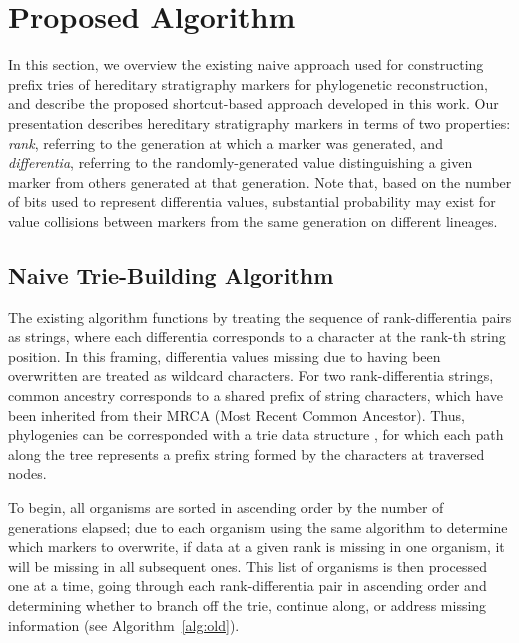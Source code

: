 \section{Proposed Algorithm} \label{sec:algorithm}

In this section, we overview the existing naive approach used for constructing prefix tries of hereditary stratigraphy markers for phylogenetic reconstruction, and describe the proposed shortcut-based approach developed in this work.
Our presentation describes hereditary stratigraphy markers in terms of two properties: \textit{rank}, referring to the generation at which a marker was generated, and \textit{differentia}, referring to the randomly-generated value distinguishing a given marker from others generated at that generation.
Note that, based on the number of bits used to represent differentia values, substantial probability may exist for value collisions between markers from the same generation on different lineages.

\subsection{Naive Trie-Building Algorithm} \label{sec:algorithm:naive}

The existing algorithm functions by treating the sequence of rank-differentia pairs as strings, where each differentia corresponds to a character at the rank-th string position.
In this framing, differentia values missing due to having been overwritten are treated as wildcard characters.
For two rank-differentia strings, common ancestry corresponds to a shared prefix of string characters, which have been inherited from their MRCA (Most Recent Common Ancestor).
Thus, phylogenies can be corresponded with a trie data structure \citep{fredkin1960trie}, for which each path along the tree represents a prefix string formed by the characters at traversed nodes.

To begin, all organisms are sorted in ascending order by the number of generations elapsed; due to each organism using the same algorithm to determine which markers to overwrite, if data at a given rank is missing in one organism, it will be missing in all subsequent ones.
This list of organisms is then processed one at a time, going through each rank-differentia pair in ascending order and determining whether to branch off the trie, continue along, or address missing information (see Algorithm~\ref{alg:old}).



